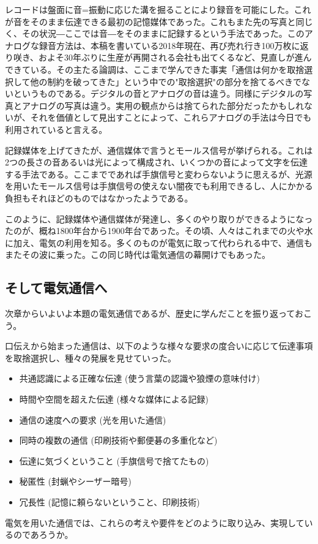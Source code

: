レコードは盤面に音=振動に応じた溝を掘ることにより録音を可能にした。これが音をそのまま伝達できる最初の記憶媒体であった。これもまた先の写真と同じく、その状況―ここでは音―をそのままに記録するという手法であった。このアナログな録音方法は、本稿を書いている2018年現在、再び売れ行き100万枚に返り咲き、およそ30年ぶりに生産が再開される会社も出てくるなど、見直しが進んできている。その主たる論調は、ここまで学んできた事実「通信は何かを取捨選択して他の制約を破ってきた」という中での"取捨選択"の部分を捨てるべきでないというものである。デジタルの音とアナログの音は違う。同様にデジタルの写真とアナログの写真は違う。実用の観点からは捨てられた部分だったかもしれないが、それを価値として見出すことによって、これらアナログの手法は今日でも利用されていると言える。

記録媒体を上げてきたが、通信媒体で言うとモールス信号が挙げられる。これは2つの長さの音あるいは光によって構成され、いくつかの音によって文字を伝達する手法である。ここまでであれば手旗信号と変わらないように思えるが、光源を用いたモールス信号は手旗信号の使えない闇夜でも利用できるし、人にかかる負担もそれほどのものではなかったようである。

このように、記録媒体や通信媒体が発達し、多くのやり取りができるようになったのが、概ね1800年台から1900年台であった。その頃、人々はこれまでの火や水に加え、電気の利用を知る。多くのものが電気に取って代わられる中で、通信もまたその波に乗った。この同じ時代は電気通信の幕開けでもあった。


\subsection{そして電気通信へ}
次章からいよいよ本題の電気通信であるが、歴史に学んだことを振り返っておこう。

口伝えから始まった通信は、以下のような様々な要求の度合いに応じて伝達事項を取捨選択し、種々の発展を見せていった。
\begin{itemize}
\item 共通認識による正確な伝達 (使う言葉の認識や狼煙の意味付け)
\item 時間や空間を超えた伝達 (様々な媒体による記録)
\item 通信の速度への要求 (光を用いた通信)
\item 同時の複数の通信 (印刷技術や郵便碁の多重化など)
\item 伝達に気づくということ (手旗信号で捨てたもの)
\item 秘匿性 (封蝋やシーザー暗号)
\item 冗長性 (記憶に頼らないということ、印刷技術)
\end{itemize}
電気を用いた通信では、これらの考えや要件をどのように取り込み、実現しているのであろうか。

